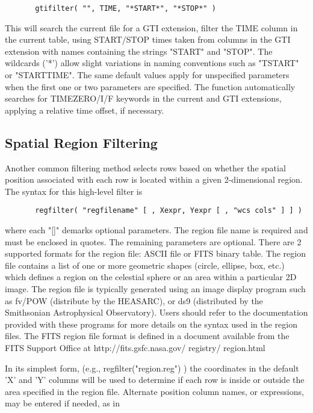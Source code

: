 \documentclass[11pt]{book}
\begin{document}
\begin{verbatim}
       gtifilter( "", TIME, "*START*", "*STOP*" )
\end{verbatim}
    This will search the current file for a GTI  extension,  filter  the
    TIME  column in the current table, using START/STOP times taken from
    columns in the GTI  extension  with  names  containing  the  strings
    "START"  and "STOP".  The wildcards ('*') allow slight variations in
    naming conventions  such  as  "TSTART"  or  "STARTTIME".   The  same
    default  values  apply for unspecified parameters when the first one
    or  two  parameters  are  specified.   The  function   automatically
    searches   for   TIMEZERO/I/F   keywords  in  the  current  and  GTI
    extensions, applying a relative time offset, if necessary.


\subsection{Spatial Region Filtering}

    Another common  filtering method selects rows based on whether the
    spatial position associated with each row is located within a given
    2-dimensional region.  The syntax for this high-level filter is

\begin{verbatim}
       regfilter( "regfilename" [ , Xexpr, Yexpr [ , "wcs cols" ] ] )
\end{verbatim}
    where each "[]" demarks optional parameters. The region file name
    is required and must be  enclosed in quotes.  The remaining
    parameters are optional.  There are 2 supported formats for the
    region file: ASCII file or FITS binary table.  The region file
    contains a list of one or more geometric shapes (circle,
    ellipse, box, etc.) which defines a region on the celestial sphere
    or an area within a particular 2D image.  The region file is
    typically generated using an image display program such as fv/POW
    (distribute by the HEASARC), or ds9 (distributed by the Smithsonian
    Astrophysical Observatory).  Users should refer to the documentation
    provided with these programs for more details on the syntax used in
    the region files.  The FITS region file format is defined in a document
    available from the FITS Support Office at
    http://fits.gsfc.nasa.gov/ registry/ region.html

    In its simplest form, (e.g., regfilter("region.reg") ) the
    coordinates in the default 'X' and 'Y' columns will be used to
    determine if each row is inside or outside the area specified in
    the region file.  Alternate position column names, or expressions,
    may be entered if needed, as in
\end{document}

